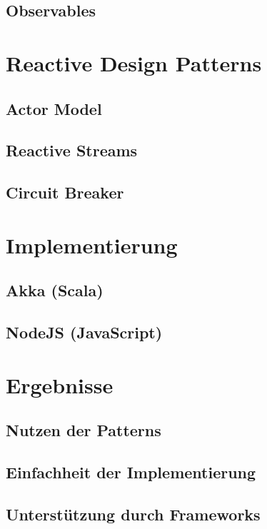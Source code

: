 \subsection{Observables}

\pagebreak

\section{Reactive Design Patterns}
\subsection{Actor Model}
\subsection{Reactive Streams}
\subsection{Circuit Breaker}

\section{Implementierung}
\subsection{Akka (Scala)}
\subsection{NodeJS (JavaScript)}

\section{Ergebnisse}
\subsection{Nutzen der Patterns}
\subsection{Einfachheit der Implementierung}
\subsection{Unterstützung durch Frameworks}
